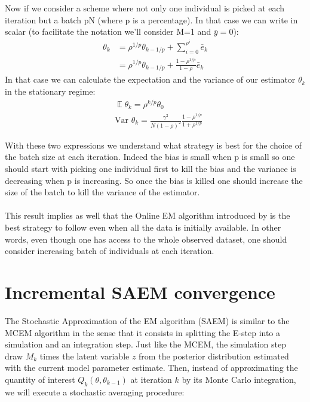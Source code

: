\documentclass{article}
\theoremstyle{plain}
\DeclareMathOperator*{\E}{\mathbb{E}}
\theoremstyle{plain}
\theoremstyle{definition}
\begin{document}
\noindent Now if we consider a scheme where not only one individual is picked at each iteration but a batch pN (where p is a percentage). In that case we can write in scalar (to facilitate the notation we'll consider M=1 and $\bar{y} = 0$):
\begin{equation}
\begin{split}
\theta_k & = \rho^{1/p} \theta_{k-1/p} + \sum_{i=0}^{\rho^{i}}\bar{e}_k\\
& =  \rho^{1/p} \theta_{k-1/p} + \frac{1-\rho^{1/p}}{1-\rho}\bar{e}_k
\end{split}
\end{equation}
In that case we can calculate the expectation and the variance of our estimator $\theta_k$ in the stationary regime:
\begin{equation}
\begin{split}
& \E \theta_k = \rho^{k/p}\theta_0\\
& \textrm{Var } \theta_k = \frac{\gamma^2}{N(1-\rho)^2}\frac{1-\rho^{1/p}}{1+\rho^{1/p}}
\end{split}
\end{equation}

With these two expressions we understand what strategy is best for the choice of the batch size at each iteration. Indeed the bias is small when p is small so one should start with picking one individual first to kill the bias and the variance is decreasing when p is increasing. So once the bias is killed one should increase the size of the batch to kill the variance of the estimator.\\
\\
This result implies as well that the Online EM algorithm introduced by \citep{cappe} is the best strategy to follow even when all the data is initially available. In other words, even though one has access to the whole observed dataset, one should consider increasing batch of individuals at each iteration.


\section{Incremental SAEM convergence}

The Stochastic Approximation of the EM algorithm (SAEM) is similar to the MCEM algorithm in the sense that it consists in splitting the E-step into a simulation and an integration step. Just like the MCEM, the simulation step draw $M_k$ times the latent variable $z$ from the posterior distribution estimated with the current model parameter estimate. Then, instead of approximating the quantity of interest $Q_k(\theta,\theta_{k-1})$ at iteration $k$ by its Monte Carlo integration, we will execute a stochastic averaging procedure:
\end{document}

